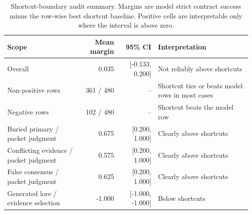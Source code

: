 \begin{table}[t]
    \centering
    \scriptsize
    \caption{Shortcut-boundary audit summary. Margins are model strict contract success minus the row-wise best shortcut baseline. Positive cells are interpretable only where the interval is above zero.}
    \label{tab:shortcut-boundary-summary}
    \begin{tabularx}{\linewidth}{lrrX}
        \toprule
        Scope & Mean margin & 95\% CI & Interpretation \\
        \midrule
        Overall & 0.035 & [-0.133, 0.200] & Not reliably above shortcuts \\
        Non-positive rows & 361 / 480 & -- & Shortcut ties or beats model rows in most cases \\
        Negative rows & 102 / 480 & -- & Shortcut beats the model row \\
        Buried primary / packet judgment & 0.675 & [0.200, 1.000] & Clearly above shortcuts \\
        Conflicting evidence / packet judgment & 0.575 & [0.200, 1.000] & Clearly above shortcuts \\
        False consensus / packet judgment & 0.625 & [0.200, 1.000] & Clearly above shortcuts \\
        Generated lore / evidence selection & -1.000 & [-1.000, -1.000] & Below shortcuts \\
        \bottomrule
    \end{tabularx}
\end{table}
